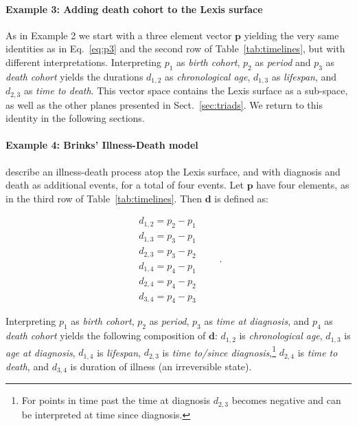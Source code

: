 \documentclass[12pt,oneside,a4paper,doublespacing]{article} %
\theoremstyle{definition}
\begin{document}
\paragraph{Example 3: Adding death cohort to the Lexis surface}

As in Example 2 we start with a three element vector
$\boldsymbol{p}$ yielding the very same identities as in Eq.~\eqref{eq:p3} and the second row of Table~\ref{tab:timelines}, but with different interpretations.
Interpreting $p_1$ as \textit{birth cohort}, $p_2$ as \textit{period} and $p_3$
as \textit{death cohort} yields the durations $d_{1,2}$ as \textit{chronological
age}, $d_{1,3}$ as \textit{lifespan}, and $d_{2,3}$ as \textit{time to death}.
This vector space contains the Lexis surface as a sub-space, as well as the other planes presented in Sect.~\ref{sec:triads}. We return to this identity
in the following sections.

\paragraph{Example 4: Brinks' Illness-Death model}

\citet{brinks2014lexis} describe an illness-death process atop the Lexis
surface, and with diagnosis and death as additional events, for a total of four
events. Let $\boldsymbol{p}$ have four elements, as in the third row of
Table~\ref{tab:timelines}. Then $\boldsymbol{d}$ is defined as:

\begin{equation}
\label{eq:p3}
\begin{matrix}
d_{1,2} = p_2 - p_1\\
d_{1,3} = p_3 - p_1\\
d_{2,3} = p_3 - p_2\\
d_{1,4} = p_4 - p_1\\
d_{2,4} = p_4 - p_2\\
d_{3,4} = p_4 - p_3
\end{matrix} \quad\quad.
\end{equation}

Interpreting $p_1$ as \textit{birth cohort}, $p_2$ as \textit{period}, $p_3$ as
\textit{time at diagnosis}, and $p_4$ as \textit{death cohort} yields the following composition
of $\boldsymbol{d}$: $d_{1,2}$ is \textit{chronological age}, $d_{1,3}$ is
\textit{age at diagnosis}, $d_{1,4}$ is \textit{lifespan}, $d_{2,3}$ is
\textit{time to/since diagnosis},\footnote{For points
in time past the time at diagnosis $d_{2,3}$ becomes negative and can be
interpreted at time since diagnosis.} $d_{2,4}$ is \textit{time to
death}, and $d_{3,4}$ is duration of illness (an irreversible state).
\end{document}
